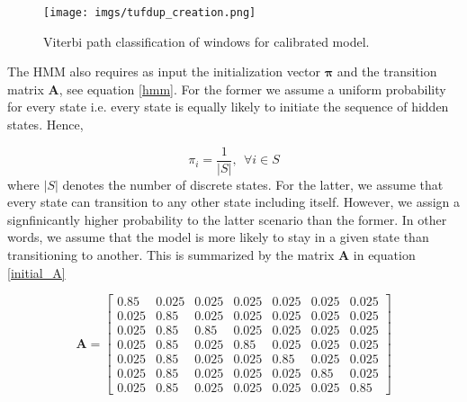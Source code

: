 \begin{figure}[!htb]
	\begin{center}
		\texttt{[image: imgs/tufdup\_creation.png]}
	\end{center}
	\caption{Viterbi path classification of windows for calibrated model.}
	\label{tufdup_creation}
\end{figure}
  

The HMM also requires as input the initialization vector $\boldsymbol{\pi}$ and the transition matrix $\mathbf{A}$, see equation \ref{hmm}. For the former we assume a uniform probability for every state i.e. every state is equally likely to initiate the sequence of hidden states. Hence, 

\begin{equation}
\pi_i = \frac{1}{|S|}, ~~ \forall i \in S
\end{equation}
where $|S|$ denotes the number of discrete states. For the latter,  we assume that every state can transition to any other state including itself. 
However, we assign a signfinicantly higher probability to the latter
scenario than the former. In other words, we assume that the model is more likely to stay in a given state than transitioning to another. This is summarized by the matrix $\mathbf{A}$ in equation \ref{initial_A}

\begin{equation}
\mathbf{A} = \begin{bmatrix}0.85 & 0.025 & 0.025 & 0.025 & 0.025 & 0.025 & 0.025 \\ 

0.025 & 0.85 & 0.025 & 0.025 & 0.025 & 0.025 & 0.025 \\
0.025 & 0.85 & 0.85 & 0.025 & 0.025 & 0.025 & 0.025 \\
0.025 & 0.85 & 0.025 & 0.85 & 0.025 & 0.025 & 0.025 \\
0.025 & 0.85 & 0.025 & 0.025 & 0.85 & 0.025 & 0.025 \\
0.025 & 0.85 & 0.025 & 0.025 & 0.025 & 0.85 & 0.025 \\
0.025 & 0.85 & 0.025 & 0.025 & 0.025 & 0.025 & 0.85 
\end{bmatrix}
\label{initial_A}
\end{equation}



 





